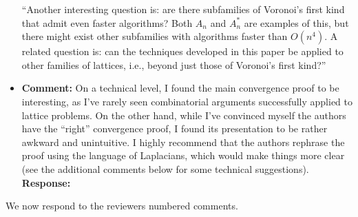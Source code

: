 \documentclass[a4paper,10pt]{article}
\begin{document}
\begin{itemize}
``Another interesting question is: are there subfamilies of Voronoi's first kind that admit even faster algorithms?  Both $A_n$ and $A_n^*$ are examples of this, but there might exist other subfamilies with algorithms faster than $O(n^4)$.  A related question is: can the techniques developed in this paper be applied to other families of lattices, i.e., beyond just those of Voronoi's first kind?''


\item\textbf{Comment:} 
On a technical level, I found the main convergence proof to be interesting, as I’ve rarely seen
combinatorial arguments successfully applied to lattice problems. On the other hand, while I’ve
convinced myself the authors have the ``right'' convergence proof, I found its presentation to be
rather awkward and unintuitive. I highly recommend that the authors rephrase the proof using
the language of Laplacians, which would make things more clear (see the additional comments
below for some technical suggestions).
\\\textbf{Response:}

\end{itemize}

We now respond to the reviewers numbered comments.
\end{document}
